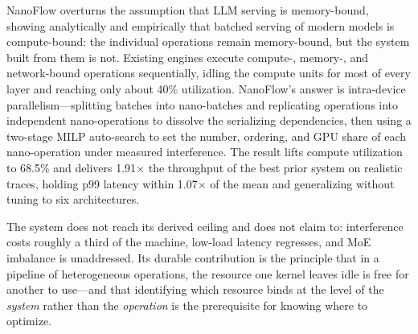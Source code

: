 \documentclass[manuscript,review]{acmart}
\newcommand{\nf}{NanoFlow\xspace}   %
\begin{document}
\nf overturns the assumption that LLM serving is memory-bound, showing analytically and empirically that batched 
serving of modern models is compute-bound: the individual operations remain memory-bound, but the system built 
from them is not. Existing engines execute compute-, memory-, and network-bound operations sequentially, idling 
the compute units for most of every layer and reaching only about 40\% utilization. \nf's answer is intra-device 
parallelism---splitting batches into nano-batches and replicating operations into independent nano-operations to 
dissolve the serializing dependencies, then using a two-stage MILP auto-search to set the number, ordering, and 
GPU share of each nano-operation under measured interference. The result lifts compute utilization to 68.5\% and 
delivers 1.91$\times$ the throughput of the best prior system on realistic traces, holding p99 latency within 
1.07$\times$ of the mean and generalizing without tuning to six architectures.

The system does not reach its derived ceiling and does not claim to: interference costs roughly a third of the 
machine, low-load latency regresses, and MoE imbalance is unaddressed. Its durable contribution is the principle 
that in a pipeline of heterogeneous operations, the resource one kernel leaves idle is free for another to 
use---and that identifying which resource binds at the level of the \emph{system} rather than the 
\emph{operation} is the prerequisite for knowing where to optimize.



\end{document}
